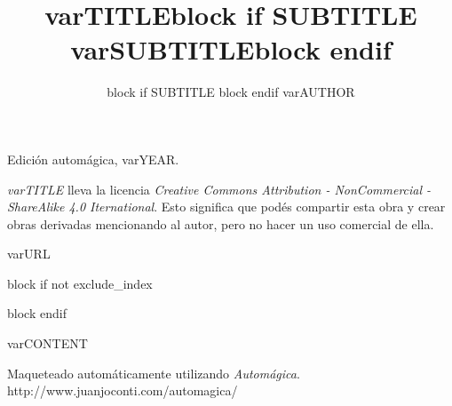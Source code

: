 \documentclass[var{FONT_SIZE}pt,twoside,openright]{book}
\title{var{TITLE}block{ if SUBTITLE }\bigbreak\large var{SUBTITLE}block{ endif }}
\author{block{ if SUBTITLE }\bigbreak block{ endif }var{AUTHOR}}
\date{}
\begin{document}

\pagestyle{plain}


%
%

\maketitle

\cleardoublepage

\thispagestyle{empty}
\noindent
Edición automágica, var{YEAR}.\\

\vspace{0.5cm}

\noindent
\emph{var{TITLE}} lleva la licencia
\emph{Creative Commons Attribution - NonCommercial - ShareAlike 4.0 Iternational}.
Esto significa que podés compartir esta obra y crear obras derivadas
mencionando al autor, pero no ha\-cer un uso comercial de ella.

\vfill

\noindent
var{URL}\\

\cleardoublepage


block{ if not exclude_index }
\renewcommand*\contentsname{var{INDEX_TITLE}}

\tableofcontents


\cleardoublepage
block{ endif }


var{CONTENT}

\cleardoublepage

%

\hspace{0pt}
\vfill
\begin{center}
Maqueteado automáticamente utilizando \emph{Automágica}.
\bigbreak
http://www.juanjoconti.com/automagica/
\end{center}
\vfill
\hspace{0pt}
\end{document}
